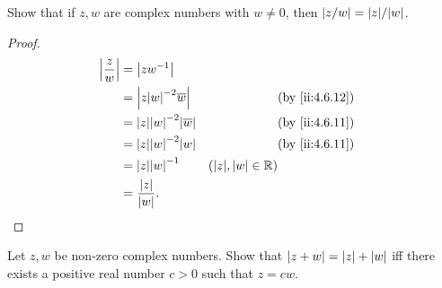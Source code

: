 \begin{ex}\label{ii:ex:4.6.7}
  Show that if \(z, w\) are complex numbers with \(w \neq 0\), then \(\abs{z / w} = \abs{z} / \abs{w}\).
\end{ex}

\begin{proof}
  \begin{align*}
    \abs{\dfrac{z}{w}} & = \abs{z w^{-1}}                                                                       \\
                       & = \abs{z \abs{w}^{-2} \overline{w}}       &                           & \by{ii:4.6.12} \\
                       & = \abs{z} \abs{w}^{-2} \abs{\overline{w}} &                           & \by{ii:4.6.11} \\
                       & = \abs{z} \abs{w}^{-2} \abs{w}            &                           & \by{ii:4.6.11} \\
                       & = \abs{z} \abs{w}^{-1}                    & (\abs{z}, \abs{w} \in \R)                  \\
                       & = \dfrac{\abs{z}}{\abs{w}}.
  \end{align*}
\end{proof}

\begin{ex}\label{ii:ex:4.6.8}
  Let \(z, w\) be non-zero complex numbers.
  Show that \(\left\lvert z + w\right\rvert = \left\lvert z\right\rvert + \left\lvert w\right\rvert\) iff there exists a positive real number \(c > 0\) such that \(z = cw\).
\end{ex}

